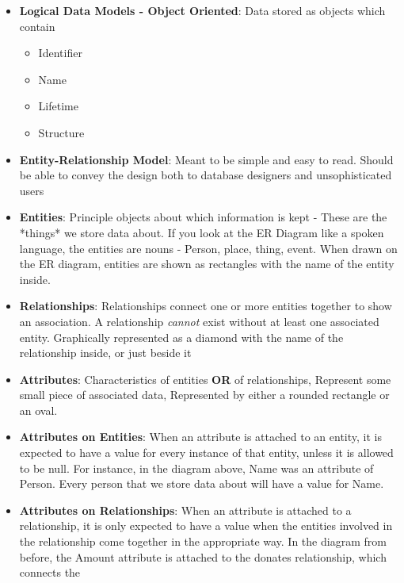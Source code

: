 \documentclass{report}
\begin{document}
\begin{itemize}
        \item \textbf{Logical Data Models - Object Oriented}: Data stored as objects which contain
            \begin{itemize}
                \item Identifier
                \item Name
                \item Lifetime
                \item Structure
            \end{itemize}
        \item \textbf{Entity-Relationship Model}: Meant to be simple and easy to read. Should be able to convey the design both to database designers and unsophisticated users
        \item \textbf{Entities}: Principle objects about which information is kept - These are the *things* we store data about. If you look at the ER Diagram like a spoken language, the entities are nouns - Person, place, thing, event. When drawn on the ER diagram, entities are shown as rectangles with the name of the entity inside.
            \bigbreak \noindent 
        \item \textbf{Relationships}:  Relationships connect one or more entities together to show an association. A relationship \textit{cannot} exist without at least one associated entity.  Graphically represented as a diamond with the name of the relationship inside, or just beside it
            \bigbreak \noindent 
        \item \textbf{Attributes}: Characteristics of entities \textbf{OR} of relationships, Represent some small piece of associated data, Represented by either a rounded rectangle or an oval.
            \bigbreak \noindent 
        \item \textbf{Attributes on Entities}: When an attribute is attached to an entity, it is expected to have a value for every instance of that entity, unless it is
            allowed to be null. For instance, in the diagram above, Name was an attribute of Person. Every person
            that we store data about will have a value for Name.
        \item \textbf{Attributes on Relationships}: When an attribute is attached to a relationship, it is only expected to have a value when the entities involved in the
            relationship come together in the appropriate way.
            In the diagram from before, the Amount attribute is attached to the donates relationship, which connects the

\end{itemize}
\end{document}
